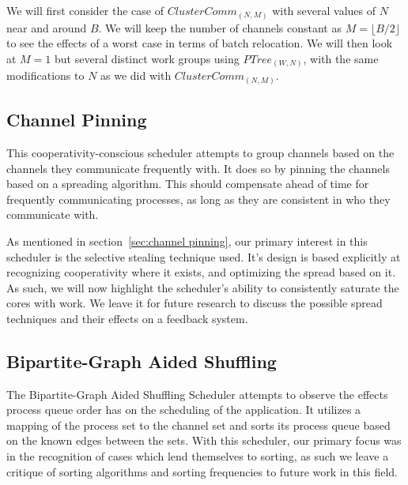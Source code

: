 We will first consider the case of $ClusterComm_{(N,M)}$ with several values of
$N$ near and around $B$. We will keep the number of channels constant as 
$M=\lfloor B/2 \rfloor$ to see the effects of a worst case in terms of batch 
relocation. We will then look at $M=1$ but several distinct work groups using
$PTree_{(W,N)}$, with the same modifications to $N$ as we did with 
$ClusterComm_{(N,M)}$.


\subsection{Channel Pinning}\label{sec:results-channelpinner}

This cooperativity-conscious scheduler attempts to group channels based on the 
channels they communicate frequently with. It does so by pinning the channels
based on a spreading algorithm. This should compensate ahead of time for 
frequently communicating processes, as long as they are consistent in who they
communicate with. 

As mentioned in section~\ref{sec:channel pinning}, our primary interest in this 
scheduler is the selective stealing technique used. It's design is based 
explicitly at recognizing cooperativity where it exists, and optimizing the
spread based on it. As such, we will now highlight the scheduler's ability to 
consistently saturate the cores with work. We leave it for future research to 
discuss the possible spread techniques and their effects on a feedback system.


\subsection{Bipartite-Graph Aided Shuffling}\label{sec:results-smartsort}

The Bipartite-Graph Aided Shuffling Scheduler attempts to observe the effects
process queue order has on the scheduling of the application. It utilizes a mapping
of the process set to the channel set and sorts its process queue based on 
the known edges between the sets. With this scheduler, our primary focus was
in the recognition of cases which lend themselves to sorting, as such we 
leave a critique of sorting algorithms and sorting frequencies to future work
in this field.

